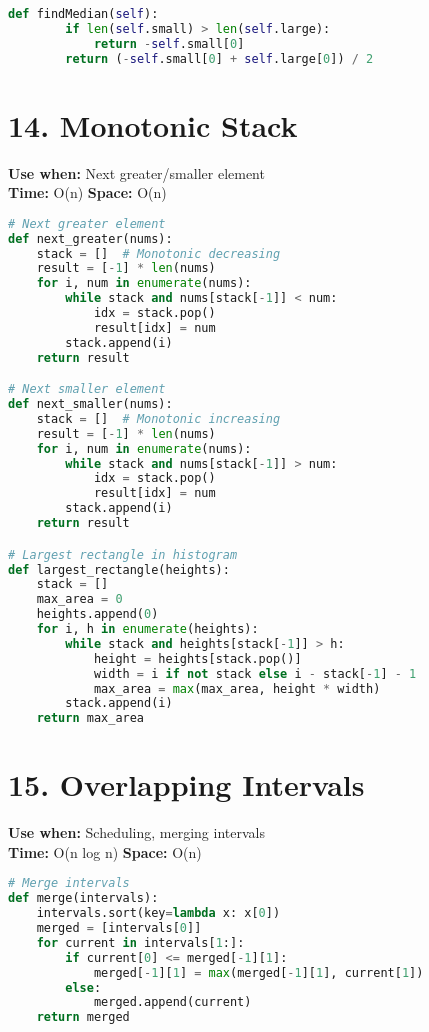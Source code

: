 \documentclass[8pt,landscape]{article}
\begin{document}
\begin{multicols}{3}
\begin{lstlisting}[language=Python]
    def findMedian(self):
        if len(self.small) > len(self.large):
            return -self.small[0]
        return (-self.small[0] + self.large[0]) / 2
\end{lstlisting}

\section*{14. Monotonic Stack}
\textbf{Use when:} Next greater/smaller element \\
\textbf{Time:} O(n) \quad \textbf{Space:} O(n)
\begin{lstlisting}[language=Python]
# Next greater element
def next_greater(nums):
    stack = []  # Monotonic decreasing
    result = [-1] * len(nums)
    for i, num in enumerate(nums):
        while stack and nums[stack[-1]] < num:
            idx = stack.pop()
            result[idx] = num
        stack.append(i)
    return result

# Next smaller element
def next_smaller(nums):
    stack = []  # Monotonic increasing
    result = [-1] * len(nums)
    for i, num in enumerate(nums):
        while stack and nums[stack[-1]] > num:
            idx = stack.pop()
            result[idx] = num
        stack.append(i)
    return result

# Largest rectangle in histogram
def largest_rectangle(heights):
    stack = []
    max_area = 0
    heights.append(0)
    for i, h in enumerate(heights):
        while stack and heights[stack[-1]] > h:
            height = heights[stack.pop()]
            width = i if not stack else i - stack[-1] - 1
            max_area = max(max_area, height * width)
        stack.append(i)
    return max_area
\end{lstlisting}

\section*{15. Overlapping Intervals}
\textbf{Use when:} Scheduling, merging intervals \\
\textbf{Time:} O(n log n) \quad \textbf{Space:} O(n)
\begin{lstlisting}[language=Python]
# Merge intervals
def merge(intervals):
    intervals.sort(key=lambda x: x[0])
    merged = [intervals[0]]
    for current in intervals[1:]:
        if current[0] <= merged[-1][1]:
            merged[-1][1] = max(merged[-1][1], current[1])
        else:
            merged.append(current)
    return merged


\end{lstlisting}
\end{multicols}
\end{document}
